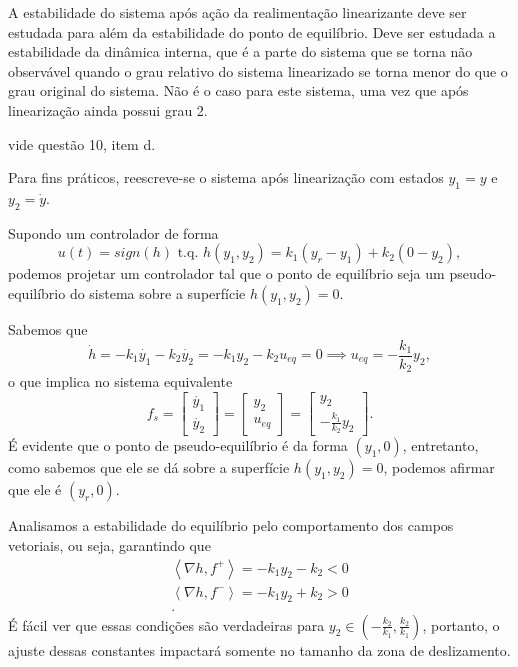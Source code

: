 \documentclass[a4paper]{report}
\begin{document}
A estabilidade do sistema após ação da realimentação linearizante deve ser estudada para além da estabilidade do ponto de equilíbrio. Deve ser estudada a estabilidade da dinâmica interna, que é a parte do sistema que se torna não observável quando o grau relativo do sistema linearizado se torna menor do que o grau original do sistema. Não é o caso para este sistema, uma vez que após linearização ainda possui grau 2.


vide questão 10, item d.


Para fins práticos, reescreve-se o sistema após linearização com estados $y_1 = y$ e $y_2=\dot{y}$.

Supondo um controlador de forma \[
    u(t) = sign(h) \text{ t.q. } h(y_1,y_2) = k_1\left( y_{r}-y_1 \right) +k_2(0-y_2)
,\] podemos projetar um controlador tal que o ponto de equilíbrio seja um pseudo-equilíbrio do sistema sobre a superfície $h\left( y_1,y_2 \right) =0$.

Sabemos que \[
\dot{h} = -k_1\dot{y_1} - k_2\dot{y_2} = -k_1y_2 - k_2u_{eq} = 0 \implies u_{eq} = -\frac{k_1}{k_2}y_2
,\] o que implica no sistema equivalente \[
f_s = \begin{bmatrix} 
    \dot{y_1} \\ \dot{y_2}
\end{bmatrix} = \begin{bmatrix} 
y_2 \\
u_{eq}
\end{bmatrix} = \begin{bmatrix} 
y_2 \\
-\frac{k_1}{k_2}y_2
\end{bmatrix} 
.\] É evidente que o ponto de pseudo-equilíbrio é da forma $(y_1,0)$, entretanto, como sabemos que ele se dá sobre a superfície $h(y_1,y_2) = 0$, podemos afirmar que ele é $\left( y_r, 0 \right)$.

Analisamos a estabilidade do equilíbrio pelo comportamento dos campos vetoriais, ou seja, garantindo que
\begin{align*}
    \left< \nabla h, f^{+} \right> = -k_1y_2 - k_2 < 0 \\
    \left< \nabla h, f^{-} \right> = -k_1y_2 + k_2 > 0 \\
.\end{align*}
É fácil ver que essas condições são verdadeiras para $y_2 \in  \left( -\frac{k_2}{k_1}, \frac{k_2}{k_1} \right) $, portanto, o ajuste dessas constantes impactará somente no tamanho da zona de deslizamento.
\end{document}

